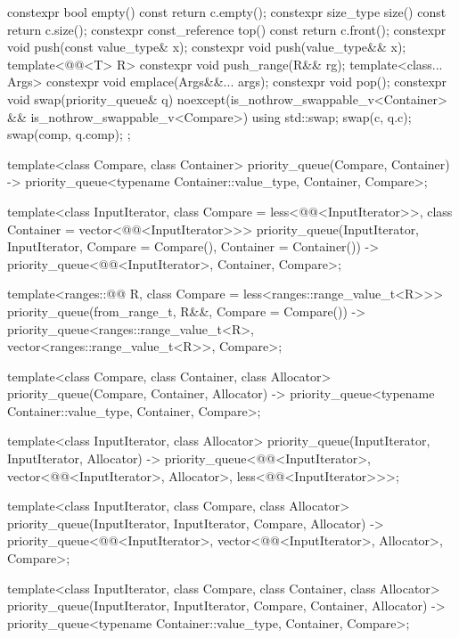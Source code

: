 \begin{codeblock}
{{    constexpr bool            empty() const { return c.empty(); }
    constexpr size_type       size()  const { return c.size(); }
    constexpr const_reference top()   const { return c.front(); }
    constexpr void push(const value_type& x);
    constexpr void push(value_type&& x);
    template<@@<T> R>
      constexpr void push_range(R&& rg);
    template<class... Args> constexpr void emplace(Args&&... args);
    constexpr void pop();
    constexpr void swap(priority_queue& q)
      noexcept(is_nothrow_swappable_v<Container> && is_nothrow_swappable_v<Compare>)
      { using std::swap; swap(c, q.c); swap(comp, q.comp); }
  };

  template<class Compare, class Container>
    priority_queue(Compare, Container)
      -> priority_queue<typename Container::value_type, Container, Compare>;

  template<class InputIterator,
           class Compare = less<@@<InputIterator>>,
           class Container = vector<@@<InputIterator>>>
    priority_queue(InputIterator, InputIterator, Compare = Compare(), Container = Container())
      -> priority_queue<@@<InputIterator>, Container, Compare>;

  template<ranges::@@ R, class Compare = less<ranges::range_value_t<R>>>
    priority_queue(from_range_t, R&&, Compare = Compare())
      -> priority_queue<ranges::range_value_t<R>, vector<ranges::range_value_t<R>>, Compare>;

  template<class Compare, class Container, class Allocator>
    priority_queue(Compare, Container, Allocator)
      -> priority_queue<typename Container::value_type, Container, Compare>;

  template<class InputIterator, class Allocator>
    priority_queue(InputIterator, InputIterator, Allocator)
      -> priority_queue<@@<InputIterator>,
                        vector<@@<InputIterator>, Allocator>,
                        less<@@<InputIterator>>>;

  template<class InputIterator, class Compare, class Allocator>
    priority_queue(InputIterator, InputIterator, Compare, Allocator)
      -> priority_queue<@@<InputIterator>,
                        vector<@@<InputIterator>, Allocator>, Compare>;

  template<class InputIterator, class Compare, class Container, class Allocator>
    priority_queue(InputIterator, InputIterator, Compare, Container, Allocator)
      -> priority_queue<typename Container::value_type, Container, Compare>;

}
\end{codeblock}
